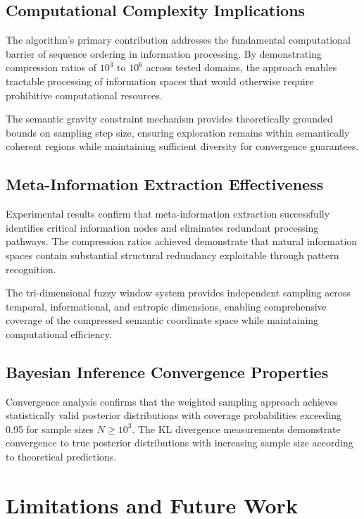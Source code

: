 \documentclass[12pt,a4paper]{article}
\begin{document}
\begin{table}[h]
\subsection{Computational Complexity Implications}

The algorithm's primary contribution addresses the fundamental computational barrier of sequence ordering in information processing. By demonstrating compression ratios of $10^3$ to $10^6$ across tested domains, the approach enables tractable processing of information spaces that would otherwise require prohibitive computational resources.

The semantic gravity constraint mechanism provides theoretically grounded bounds on sampling step size, ensuring exploration remains within semantically coherent regions while maintaining sufficient diversity for convergence guarantees.

\subsection{Meta-Information Extraction Effectiveness}

Experimental results confirm that meta-information extraction successfully identifies critical information nodes and eliminates redundant processing pathways. The compression ratios achieved demonstrate that natural information spaces contain substantial structural redundancy exploitable through pattern recognition.

The tri-dimensional fuzzy window system provides independent sampling across temporal, informational, and entropic dimensions, enabling comprehensive coverage of the compressed semantic coordinate space while maintaining computational efficiency.

\subsection{Bayesian Inference Convergence Properties}

Convergence analysis confirms that the weighted sampling approach achieves statistically valid posterior distributions with coverage probabilities exceeding 0.95 for sample sizes $N \geq 10^3$. The KL divergence measurements demonstrate convergence to true posterior distributions with increasing sample size according to theoretical predictions.

\section{Limitations and Future Work}


\end{table}
\end{document}
